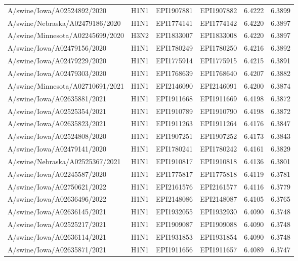 \begin{tabular}{L{1.95in}|L{.25in}|L{.60in}|L{.6in}|C{1in}|C{1in}}
 A/swine/Iowa/A02524892/2020 &H1N1&EPI1907881&EPI1907882&6.4222&6.3899\\
 A/swine/Nebraska/A02479186/2020 &H1N1&EPI1774141&EPI1774142&6.4220&6.3897\\
 A/swine/Minnesota/A02245699/2020 &H3N2&EPI1833007&EPI1833008&6.4220&6.3897\\
 A/swine/Iowa/A02479156/2020 &H1N1&EPI1780249&EPI1780250&6.4216&6.3892\\
 A/swine/Iowa/A02479229/2020 &H1N1&EPI1775914&EPI1775915&6.4215&6.3891\\
 A/swine/Iowa/A02479303/2020 &H1N1&EPI1768639&EPI1768640&6.4207&6.3882\\
 A/swine/Minnesota/A02710691/2021 &H1N1&EPI2146090&EPI2146091&6.4200&6.3874\\
 A/swine/Iowa/A02635881/2021 &H1N1&EPI1911668&EPI1911669&6.4198&6.3872\\
 A/swine/Iowa/A02525354/2021 &H1N1&EPI1910789&EPI1910790&6.4198&6.3872\\
 A/swine/Iowa/A02635823/2021 &H1N1&EPI1911263&EPI1911264&6.4176&6.3847\\
 A/swine/Iowa/A02524808/2020 &H1N1&EPI1907251&EPI1907252&6.4173&6.3843\\
 A/swine/Iowa/A02479141/2020 &H1N1&EPI1780241&EPI1780242&6.4161&6.3829\\
 A/swine/Nebraska/A02525367/2021 &H1N1&EPI1910817&EPI1910818&6.4136&6.3801\\
 A/swine/Iowa/A02245587/2020 &H1N1&EPI1775817&EPI1775818&6.4119&6.3781\\
 A/swine/Iowa/A02750621/2022 &H1N1&EPI2161576&EPI2161577&6.4116&6.3779\\
 A/swine/Iowa/A02636496/2022 &H1N1&EPI2148086&EPI2148087&6.4105&6.3765\\
 A/swine/Iowa/A02636145/2021 &H1N1&EPI1932055&EPI1932930&6.4090&6.3748\\
 A/swine/Iowa/A02525217/2021 &H1N1&EPI1909087&EPI1909088&6.4090&6.3748\\
 A/swine/Iowa/A02636114/2021 &H1N1&EPI1931853&EPI1931854&6.4090&6.3748\\
 A/swine/Iowa/A02635871/2021 &H1N1&EPI1911656&EPI1911657&6.4089&6.3747\\

\end{tabular}
